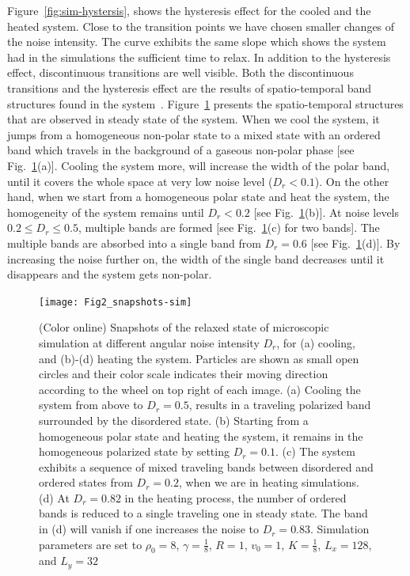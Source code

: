 \documentclass[reprint,floatfix,amsmath,amssymb,aps,pre,showkeys,showpacs,superscriptaddress]{revtex4-1}
\newcommand{\hl}[1]{\textcolor{hlcolor}{#1}}
\begin{document}
Figure~\ref{fig:sim-hystersis}, shows the hysteresis effect for the cooled and the heated system. \hl{Close to the transition points we have chosen smaller changes of the noise intensity. The curve exhibits the same slope which shows the system had in the simulations the sufficient time to relax.} In addition to the hysteresis effect, discontinuous transitions are well visible. Both the discontinuous transitions and the hysteresis effect are the results of spatio-temporal band structures found in the system~\cite{Gregoire2004,nagy2007,Chate2008,Chate2008a,Ihle2013invasion,solon2015from,solon2015flocking,solon2015pattern,thuroff2014numerical}. Figure~\ref{fig:snapshots-sim} presents the spatio-temporal structures that are observed in \hl{steady state of} the system. When we cool the system, it jumps from a homogeneous non-polar state to a mixed state with an ordered band which travels in the background of a gaseous non-polar phase [see Fig.~\ref{fig:snapshots-sim}(a)]. Cooling the system more, will increase the width of the polar band, until it covers the whole space at very low noise level ($D_r < 0.1$). On the other hand, when we start from a homogeneous polar state and heat the system, the homogeneity of the system remains until $D_r<0.2$ [see Fig.~\ref{fig:snapshots-sim}(b)]. At noise levels \hl{$0.2 \leq D_r \leq 0.5$}, multiple bands are formed [see Fig.~\ref{fig:snapshots-sim}(c) for two bands]. The multiple bands are absorbed into a single band from $D_r=0.6$ [see Fig.~\ref{fig:snapshots-sim}(d)]. By increasing the noise further \hl{on}, the width of the single band decreases until it disappears and the system gets non-polar.

\begin{figure}
	\centering
	\texttt{[image: Fig2\_snapshots-sim]}
	\caption{(Color online) Snapshots \hl{of the relaxed state} of microscopic simulation \hl{at different} angular noise intensity $D_r$, for (a) cooling, and (b)-(d) heating the system. Particles are shown as small open circles and their color scale indicates their moving direction according to the wheel on top right of each image. (a) Cooling the system from above to $D_r=0.5$, results in a traveling polarized band surrounded by the disordered state. (b) \hl{Starting from a homogeneous polar state and heating the system, it remains in the homogeneous polarized state by setting $D_r=0.1$. (c) The system exhibits a sequence of mixed traveling bands between disordered and ordered states from $D_r=0.2$, when we are in heating simulations. (d) At $D_r=0.82$ in the heating process, the number of ordered bands is reduced to a single traveling one in steady state}. The band in (d) will vanish if one increases the noise to $D_r=0.83$. Simulation parameters are set to $\rho_0=8$, $\gamma=\tfrac{1}{8}$, $R=1$, $v_0=1$, $K=\tfrac{1}{8}$, $L_x=128$, and $L_y=32$}
\label{fig:snapshots-sim}
\end{figure}
\end{document}
